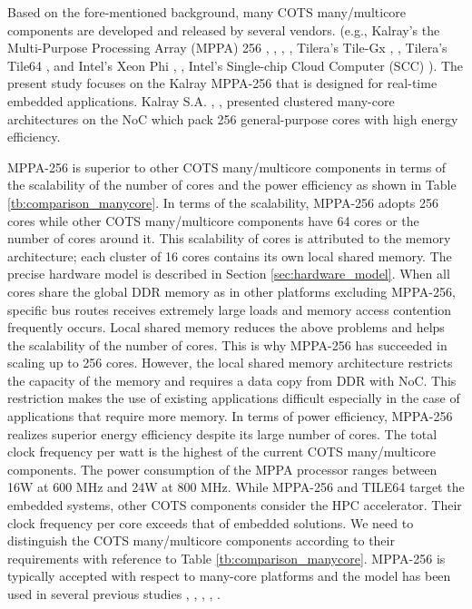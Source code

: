 \documentclass{sig-alternate-05-2015}
\begin{document}
Based on the fore-mentioned background, many COTS many/multicore components are developed and released by several vendors.
(e.g., Kalray's the Multi-Purpose Processing Array (MPPA) 256 \cite{de2013distributed}, \cite{de2013clustered}, \cite{de2014time}, \cite{baron2010single}, Tilera's Tile-Gx \cite{schooler2010tile}, \cite{ramey2011tile}, Tilera's Tile64 \cite{bell2008tile64}, and Intel's Xeon Phi \cite{chrysos2014intel}, \cite{chrysos2012intel}, Intel's Single-chip Cloud Computer (SCC) \cite{baron2010single}).
The present study focuses on the Kalray MPPA-256 that is designed for real-time embedded applications.
Kalray S.A. \cite{de2013distributed}, \cite{de2013clustered}, \cite{de2014time} presented clustered many-core architectures on the NoC which pack 256 general-purpose cores with high energy efficiency.

MPPA-256 is superior to other COTS many/multicore components in terms of the scalability of the number of cores and the power efficiency as shown in Table \ref{tb:comparison_manycore}.
In terms of the scalability, MPPA-256 adopts 256 cores while other COTS many/multicore components have 64 cores or the number of cores around it.
This scalability of cores is attributed to the memory architecture; each cluster of 16 cores contains its own local shared memory.
The precise hardware model is described in Section \ref{sec:hardware_model}.
When all cores share the global DDR memory as in other platforms excluding MPPA-256, specific bus routes receives extremely large loads and memory access contention frequently occurs.
Local shared memory reduces the above problems and helps the scalability of the number of cores.
This is why MPPA-256 has succeeded in scaling up to 256 cores.
However, the local shared memory architecture restricts the capacity of the memory and requires a data copy from DDR with NoC.
This restriction makes the use of existing applications difficult especially in the case of applications that require more memory.
In terms of power efficiency, MPPA-256 realizes superior energy efficiency despite its large number of cores.
The total clock frequency per watt is the highest of the current COTS many/multicore components.
The power consumption of the MPPA processor ranges between 16W at 600 MHz and 24W at 800 MHz.
While MPPA-256 and TILE64 \cite{bell2008tile64} target the embedded systems, other COTS components consider the HPC accelerator.
Their clock frequency per core exceeds that of embedded solutions.
We need to distinguish the COTS many/multicore components according to their requirements with reference to Table \ref{tb:comparison_manycore}.
MPPA-256 is typically accepted with respect to many-core platforms and the model has been used in several previous studies \cite{perret2016temporal}, \cite{becker2016contention}, \cite{carle2014static}, \cite{perret2016mapping}, \cite{perret2016predictable}.
\end{document}
